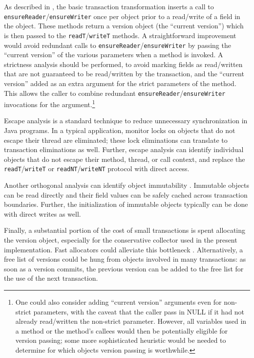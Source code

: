 As described in , the basic transaction
transformation inserts a call to
\texttt{ensureReader}/\texttt{ensureWriter} once per object prior to a
read/write of a field in the object.  These methods return a version
object (the ``current version'') which is then passed to the
\texttt{readT}/\texttt{writeT} methods.  A straightforward improvement
would avoid redundant calls to
\texttt{ensureReader}/\texttt{ensureWriter} by passing the ``current
version'' of the various parameters when a method is invoked.  A
strictness analysis should be performed, to avoid marking fields as
read/written that are not guaranteed to be read/written by the
transaction, and the ``current version'' added as an extra argument
for the strict parameters of the method.  This allows the caller to
combine redundant \texttt{ensureReader}/\texttt{ensureWriter}
invocations for the argument.\footnote{One could also consider adding
``current version'' arguments even for non-strict parameters, with the
  caveat that the caller pass in NULL if it had not already
  read/written the non-strict parameter.  However, 
  all variables used in a method or the method's callees would then be
  potentially eligible for version passing; some more sophisticated
  heuristic would be needed to determine for which objects
  version passing is worthwhile.}

Escape analysis \cite{WhaleyRi99} is a standard technique to reduce
unnecessary synchronization in Java programs.  In a typical
application, monitor locks on objects that do not escape their thread
are eliminated; these lock eliminations can translate to transaction
eliminations as well.  Further, escape analysis can identify
individual objects that do not escape their method, thread,
or call context, and replace the \texttt{readT}/\texttt{writeT} or
\texttt{readNT}/\texttt{writeNT} protocol with direct access.

Another orthogonal analysis can identify object immutability
\cite{ZibinPoArKiEr07}.  Immutable objects can be read directly and
their field values can be safely cached across transaction boundaries.
Further, the initialization of immutable objects typically can be done
with direct writes as well.

Finally, a substantial portion of the cost of small transactions is
spent allocating the version object, especially for the conservative
collector used in the present implementation.  Fast allocators could
alleviate this bottleneck \cite{Appel89}.  Alternatively, a free list
of versions could be hung from objects involved in many transactions:
as soon as a version commits, the previous version can be added to the
free list for the use of the next transaction.

